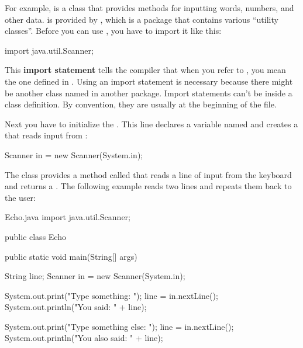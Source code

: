 
For example,  is a class that provides methods for inputting words, numbers, and other data.
 is provided by , which is a package that contains various ``utility classes''.
Before you can use , you have to import it like this:

\begin{code}
import java.util.Scanner;
\end{code}


This {\bf import statement} tells the compiler that when you refer to , you mean the one defined in .
Using an import statement is necessary because there might be another class named  in another package.
Import statements can't be inside a class definition.
By convention, they are usually at the beginning of the file.

Next you have to initialize the .
This line declares a  variable named  and creates a  that reads input from :

\begin{code}
Scanner in = new Scanner(System.in);
\end{code}

The  class provides a method called  that reads a line of input from the keyboard and returns a .
The following example reads two lines and repeats them back to the user:

\begin{trinket}{Echo.java}
import java.util.Scanner;

public class Echo {

    public static void main(String[] args) {
        String line;
        Scanner in = new Scanner(System.in);

        System.out.print("Type something: ");
        line = in.nextLine();
        System.out.println("You said: " + line);

        System.out.print("Type something else: ");
        line = in.nextLine();
        System.out.println("You also said: " + line);
    }
}
\end{trinket}

